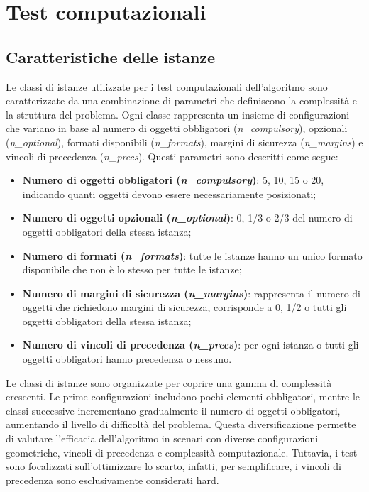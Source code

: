 \chapter{Test computazionali}
\label{cap:verifica-validazione}


\section{Caratteristiche delle istanze}

Le classi di istanze utilizzate per i test computazionali dell'algoritmo sono caratterizzate da una combinazione di parametri che definiscono la complessità e la struttura del problema. Ogni classe rappresenta un insieme di configurazioni che variano in base al numero di oggetti obbligatori (\emph{n\_compulsory}), opzionali (\emph{n\_optional}), formati disponibili (\emph{n\_formats}), margini di sicurezza (\emph{n\_margins}) e vincoli di precedenza (\emph{n\_precs}). Questi parametri sono descritti come segue:

\begin{itemize}
    \item \textbf{Numero di oggetti obbligatori (\emph{n\_compulsory})}: 5, 10, 15 o 20, indicando quanti oggetti devono essere necessariamente posizionati;
    \item \textbf{Numero di oggetti opzionali (\emph{n\_optional})}: 0, 1/3 o 2/3 del numero di oggetti obbligatori della stessa istanza;
    \item \textbf{Numero di formati (\emph{n\_formats})}: tutte le istanze hanno un unico formato disponibile che non è lo stesso per tutte le istanze;
    \item \textbf{Numero di margini di sicurezza (\emph{n\_margins})}: rappresenta il numero di oggetti che richiedono margini di sicurezza, corrisponde a 0, 1/2 o tutti gli oggetti obbligatori della stessa istanza;
    \item \textbf{Numero di vincoli di precedenza (\emph{n\_precs})}: per ogni istanza o tutti gli oggetti obbligatori hanno precedenza o nessuno. 
\end{itemize}

Le classi di istanze sono organizzate per coprire una gamma di complessità crescenti. Le prime configurazioni includono pochi elementi obbligatori, mentre le classi successive incrementano gradualmente il numero di oggetti obbligatori, aumentando il livello di difficoltà del problema. Questa diversificazione permette di valutare l'efficacia dell'algoritmo in scenari con diverse configurazioni geometriche, vincoli di precedenza e complessità computazionale. Tuttavia, i test sono focalizzati sull'ottimizzare lo scarto, infatti, per semplificare, i vincoli di precedenza sono esclusivamente considerati hard.

